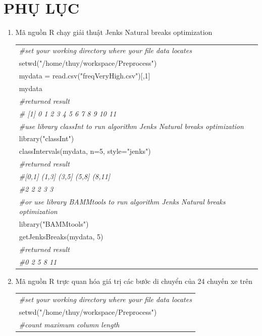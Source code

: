 \documentclass[a4paper, 13pt]{report}
\begin{document}
\chapter{PHỤ LỤC}
\begin{enumerate}[label=\textbf{PL\arabic*}]
\item Mã nguồn R chạy giải thuật Jenks Natural breaks optimization
\begin{flushleft}
\begin{tabular}{  |l| }
\hline 
\textit{\#set your working directory where your file data locates}\\
setwd("/home/thuy/workspace/Preprocess")\\
mydata = read.csv("freqVeryHigh.csv")[,1]\\
mydata\\
\textit{\#returned result}\\
\textit{\# [1]  0  1  2  3  4  5  6  7  8  9 10 11}\\
\textit{\#use library classInt to run algorithm Jenks Natural breaks optimization}\\
library("classInt")\\
classIntervals(mydata, n=5, style="jenks")\\
\textit{\#returned result}\\
\textit{\#[0,1]  (1,3]  (3,5]  (5,8] (8,11]}\\
\textit{\#2      2      2      3      3 }\\
\textit{\#or use library BAMMtools to run algorithm Jenks Natural breaks optimization}\\
library("BAMMtools")\\
getJenksBreaks(mydata, 5)\\
\textit{\#returned result}\\
\textit{\#0  2  5  8 11}\\
\hline
\end{tabular}
\end{flushleft}
\item  \label{trucquandichuyen} Mã nguồn R trực quan hóa giá trị các bước di chuyển của 24 chuyến xe trên\\
\begin{flushleft}
\begin{tabular}{ |l| }
\hline 
\textit{\#set your working directory where your file data locates}\\
setwd("/home/thuy/workspace/Preprocess")\\
\textit{\#count maximum column length}\\

\end{tabular}
\end{flushleft}
\end{enumerate}
\end{document}
